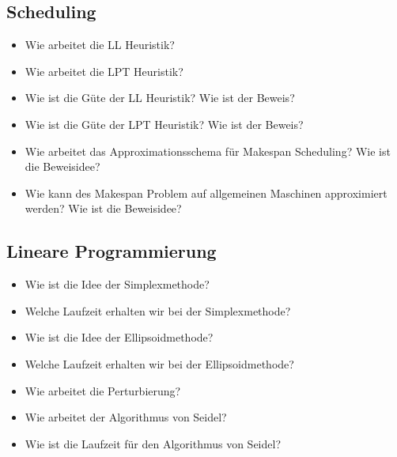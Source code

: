 \documentclass{panikzettel}
\begin{document}
\begin{halfboxl}

\subsection*{Scheduling}
\begin{itemize}
    \item Wie arbeitet die LL Heuristik?
    \item Wie arbeitet die LPT Heuristik?
    \item Wie ist die Güte der LL Heuristik? Wie ist der Beweis?
    \item Wie ist die Güte der LPT Heuristik? Wie ist der Beweis?
    \item Wie arbeitet das Approximationsschema für Makespan Scheduling? Wie ist die Beweisidee?
    \item Wie kann des Makespan Problem auf allgemeinen Maschinen approximiert werden? Wie ist die Beweisidee?
\end{itemize}

\end{halfboxl}%
\begin{halfboxr}

\subsection*{Lineare Programmierung}
\begin{itemize}
    \item Wie ist die Idee der Simplexmethode?
    \item Welche Laufzeit erhalten wir bei der Simplexmethode?
    \item Wie ist die Idee der Ellipsoidmethode?
    \item Welche Laufzeit erhalten wir bei der Ellipsoidmethode?
    \item Wie arbeitet die Perturbierung?
    \item Wie arbeitet der Algorithmus von Seidel?
    \item Wie ist die Laufzeit für den Algorithmus von Seidel?
\end{itemize}

\end{halfboxr}
\end{document}

